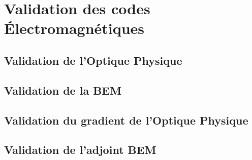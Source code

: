 \chapter{Validation des codes \'Electromagnétiques}
\section{Validation de l'Optique Physique}
\lipsum
\section{Validation de la BEM}
\lipsum
\section[Validation du gradient de l'Optique Physique]{Validation du gradient de l'Optique Physique}
\lipsum
\section[Validation de l'adjoint BEM]{Validation de l'adjoint BEM}
\lipsum